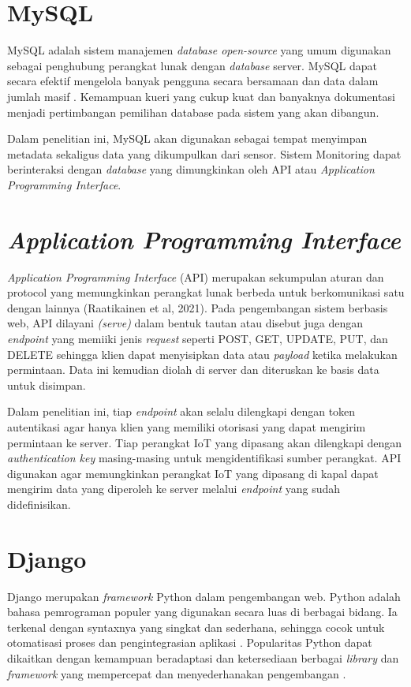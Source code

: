 \section{MySQL}

MySQL adalah sistem manajemen \textit{database open-source} yang umum digunakan sebagai penghubung perangkat lunak dengan \textit{database} server. MySQL dapat secara efektif mengelola banyak pengguna secara bersamaan dan data dalam jumlah masif \parencite{article:gomez}. Kemampuan kueri yang cukup kuat dan banyaknya dokumentasi menjadi pertimbangan pemilihan database pada sistem yang akan dibangun.

Dalam penelitian ini, MySQL akan digunakan sebagai tempat menyimpan metadata sekaligus data yang dikumpulkan dari sensor. Sistem Monitoring dapat berinteraksi dengan \textit{database} yang dimungkinkan oleh API atau \textit{Application Programming Interface}.


\section{\textit{Application Programming Interface}}
\textit{Application Programming Interface} (API) merupakan sekumpulan aturan dan protocol yang memungkinkan perangkat lunak berbeda untuk berkomunikasi satu dengan lainnya (Raatikainen et al, 2021). Pada pengembangan sistem berbasis web, API dilayani \textit{(serve)} dalam bentuk tautan atau disebut juga dengan \textit{endpoint} yang memiiki jenis \textit{request} seperti POST, GET, UPDATE, PUT, dan DELETE sehingga klien dapat menyisipkan data atau \textit{payload} ketika melakukan permintaan. Data ini kemudian diolah di server dan diteruskan ke basis data untuk disimpan.

Dalam penelitian ini, tiap \textit{endpoint} akan selalu dilengkapi dengan token autentikasi agar hanya klien yang memiliki otorisasi yang dapat mengirim permintaan ke server. Tiap perangkat IoT yang dipasang akan dilengkapi dengan \textit{authentication key} masing-masing untuk mengidentifikasi sumber perangkat. API digunakan agar memungkinkan perangkat IoT yang dipasang di kapal dapat mengirim data yang diperoleh ke server melalui \textit{endpoint} yang sudah didefinisikan.

\section{Django}

Django merupakan \textit{framework} Python dalam pengembangan web. Python adalah bahasa pemrograman populer yang digunakan secara luas di berbagai bidang. Ia terkenal dengan syntaxnya yang singkat dan sederhana, sehingga cocok untuk otomatisasi proses dan pengintegrasian aplikasi \cite{article:buhler}. Popularitas Python dapat dikaitkan dengan kemampuan beradaptasi dan ketersediaan berbagai \textit{library} dan \textit{framework} yang mempercepat dan menyederhanakan pengembangan \cite{article:malloy}.

